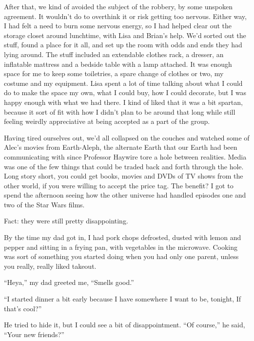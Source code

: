 After that, we kind of avoided the subject of the robbery, by some unspoken agreement.  It wouldn't do to overthink it or risk getting too nervous.  Either way, I had felt a need to burn some nervous energy, so I had helped clear out the storage closet around lunchtime, with Lisa and Brian's help.  We'd sorted out the stuff, found a place for it all, and set up the room with odds and ends they had lying around.  The stuff included an extendable clothes rack, a dresser, an inflatable mattress and a bedside table with a lamp attached.  It was enough space for me to keep some toiletries, a spare change of clothes or two, my costume and my equipment.  Lisa spent a lot of time talking about what I could do to make the space my own, what I could buy, how I could decorate, but I was happy enough with what we had there.  I kind of liked that it was a bit spartan, because it sort of fit with how I didn't plan to be around that long while still feeling weirdly appreciative at being accepted as a part of the group.



Having tired ourselves out, we'd all collapsed on the couches and watched some of Alec's movies from Earth-Aleph, the alternate Earth that our Earth had been communicating with since Professor Haywire tore a hole between realities.  Media was one of the few things that could be traded back and forth through the hole.  Long story short, you could get books, movies and DVDs of TV shows from the other world, if you were willing to accept the price tag. The benefit? I got to spend the afternoon seeing how the other universe had handled episodes one and two of the Star Wars films.



Fact: they were still pretty disappointing.



By the time my dad got in, I had pork chops defrosted, dusted with lemon and pepper and sitting in a frying pan, with vegetables in the microwave.  Cooking was sort of something you started doing when you had only one parent, unless you really, really liked takeout.



``Heya,'' my dad greeted me, ``Smells good.''



``I started dinner a bit early because I have somewhere I want to be, tonight, If that's cool?''



He tried to hide it, but I could see a bit of disappointment.  ``Of course,'' he said, ``Your new friends?''



